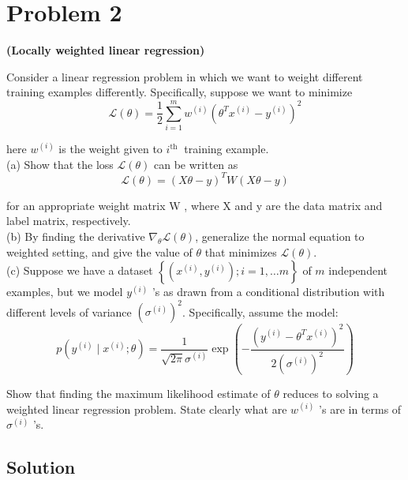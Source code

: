 \section*{Problem 2}

\textbf{(Locally weighted linear regression)}

Consider a linear regression problem in which we want to weight different training examples differently. Specifically, suppose we want to minimize
\[
    \mathcal{L}(\theta)=\frac{1}{2} \sum_{i=1}^{m} w^{(i)}\left(\theta^{T} x^{(i)}-y^{(i)}\right)^{2}
\]

here \( w^{(i)} \) is the weight given to \( i^{\text {th }} \) training example.\\
(a) Show that the loss \( \mathcal{L}(\theta) \) can be written as
\[
    \mathcal{L}(\theta)=(X \theta-y)^{T} W(X \theta-y)
\]

for an appropriate weight matrix W , where X and y are the data matrix and label matrix, respectively.\\
(b) By finding the derivative \( \nabla_{\theta} \mathcal{L}(\theta) \), generalize the normal equation to weighted setting, and give the value of \( \theta \) that minimizes \( \mathcal{L}(\theta) \).\\
(c) Suppose we have a dataset \( \left\{\left(x^{(i)}, y^{(i)}\right) ; i=1, \ldots m\right\} \) of \( m \) independent examples, but we model \( y^{(i)} \) 's as drawn from a conditional distribution with different levels of variance \( \left(\sigma^{(i)}\right)^{2} \). Specifically, assume the model:
\[
    p\left(y^{(i)} \mid x^{(i)} ; \theta\right)=\frac{1}{\sqrt{2 \pi} \sigma^{(i)}} \exp \left(-\frac{\left(y^{(i)}-\theta^{T} x^{(i)}\right)^{2}}{2\left(\sigma^{(i)}\right)^{2}}\right)
\]

Show that finding the maximum likelihood estimate of \( \theta \) reduces to solving a weighted linear regression problem. State clearly what are \( w^{(i)} \) 's are in terms of \( \sigma^{(i)} \) 's.

\subsection*{Solution}
